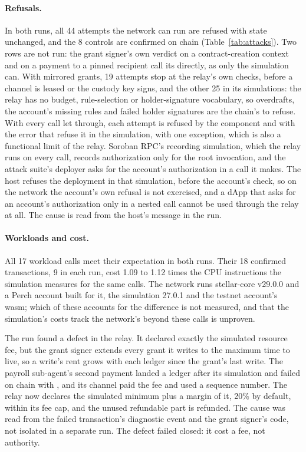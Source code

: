 \paragraph{Refusals.} In both runs, all 44 attempts the network can run are
refused with state unchanged, and the 8 controls are confirmed on
chain (Table~\ref{tab:attacks}). Two rows are not
run: the grant signer's own verdict on a contract-creation context and on a
payment to a pinned  recipient call its 
directly, as only the simulation can. With mirrored grants, 19 attempts stop
at the relay's own checks, before a channel is leased or the custody key
signs, and the other 25 in its simulations: the
relay has no budget, rule-selection or holder-signature vocabulary, so
overdrafts, the account's missing rules and failed holder signatures are the
chain's to refuse. With every call let through, each attempt is refused by the
component and with the error that refuse it in the
simulation, with one exception, which is also a
functional limit of the relay. Soroban RPC's recording simulation, which the
relay runs on every call, records authorization only for the root invocation,
and the attack suite's deployer asks for the account's authorization in a call
it makes. The host refuses the deployment in that simulation, before the
account's check, so on the network the account's own refusal is not
exercised, and a dApp that asks for an account's authorization only in a
nested call cannot be used through the relay at all.
The cause is read from the host's message in the run.

\paragraph{Workloads and cost.} All 17 workload calls meet their expectation
in both runs. Their 18 confirmed transactions, 9 in
each run, cost 1.09
to 1.12 times the CPU instructions the simulation measures for the same
calls. The network runs stellar-core v29.0.0 and a
Perch account built for it, the simulation  27.0.1 and
the testnet account's wasm; which of these accounts for the difference is not
measured, and that the simulation's costs track the network's beyond these
calls is unproven.

The run found a defect in the relay. It declared exactly the simulated
resource fee, but the grant signer extends every grant it writes to the
maximum time to live, so a write's rent grows with each ledger since the
grant's last write. The payroll sub-agent's second payment landed a ledger
after its simulation and failed on chain with
, and its channel paid the fee and used a
sequence number. The relay now declares the simulated minimum plus a margin of
it, 20\% by default, within its fee cap, and the unused refundable part is
refunded. The cause was read from the failed
transaction's diagnostic event and the grant signer's code, not isolated in a
separate run. The defect failed closed: it cost a fee, not authority.

